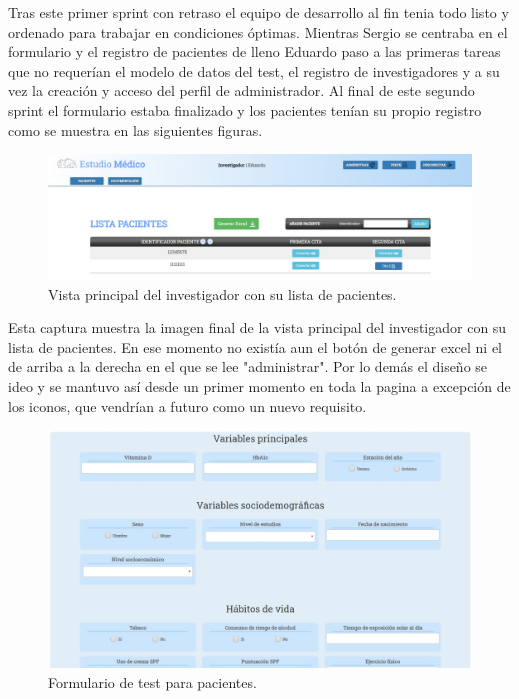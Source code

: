 Tras este primer sprint con retraso el equipo de desarrollo al fin tenia todo listo y ordenado para trabajar en condiciones óptimas. Mientras Sergio se centraba en el formulario y el registro de pacientes de lleno Eduardo paso a las primeras tareas que no requerían el modelo de datos del test, el registro de investigadores y a su vez la creación y acceso del perfil de administrador. Al final de este segundo sprint el formulario estaba finalizado y los pacientes tenían su propio registro como se muestra en las siguientes figuras.
\newline

 \begin{figure}[h]
    \centering
     \includegraphics[width=1\textwidth]{images/investigadorPacientes.jpg}
    \caption{Vista principal del investigador con su lista de pacientes.}
\end{figure}

Esta captura muestra la imagen final de la vista principal del investigador con su lista de pacientes. En ese momento no existía aun el botón de generar excel ni el de arriba a la derecha en el que se lee "administrar". Por lo demás el diseño se ideo y se mantuvo así desde un primer momento en toda la pagina a excepción de los iconos, que vendrían a futuro como un nuevo requisito.

\begin{figure}[h]
    \centering
     \includegraphics[width=1\textwidth]{images/testPacientes.jpg}
    \caption{Formulario de test para pacientes.}
\end{figure}

